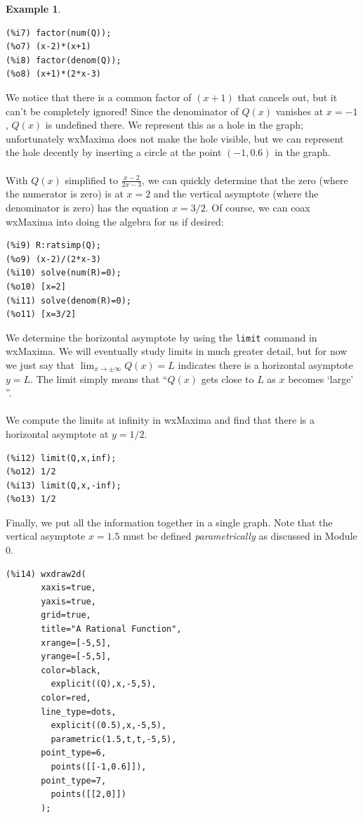 \documentclass[10.5pt,twoside]{report}
\theoremstyle{definition}
\newtheorem{exmp}{Example}[section]
\begin{document}
\begin{exmp}
\begin{verbatim}
(%i7) factor(num(Q));
(%o7) (x-2)*(x+1)
(%i8) factor(denom(Q));
(%o8) (x+1)*(2*x-3)
\end{verbatim}

We notice that there is a common factor of $(x+1)$ that cancels out, but it can't be completely ignored!  Since the denominator of $Q(x)$ vanishes at $x=-1$, $Q(x)$ is undefined there.  We represent this as a hole in the graph; unfortunately wxMaxima does not make the hole visible, but we can represent the hole decently by inserting a circle at the point $(-1,0.6)$ in the graph.\\
${}$\\
With $Q(x)$ simplified to $\frac{x-2}{2x-3}$, we can quickly determine that the zero (where the numerator is zero) is at $x=2$ and the vertical asymptote (where the denominator is zero) has the equation $x=3/2$.  Of course, we can coax wxMaxima into doing the algebra for us if desired:

\begin{verbatim}
(%i9) R:ratsimp(Q);
(%o9) (x-2)/(2*x-3)
(%i10) solve(num(R)=0);
(%o10) [x=2]
(%i11) solve(denom(R)=0);
(%o11) [x=3/2]
\end{verbatim}

We determine the horizontal asymptote by using the \verb|limit| command in wxMaxima.  We will eventually study limits in much greater detail, but for now we just say that $\lim_{x \to \pm\infty} Q(x)=L$ indicates there is a horizontal asymptote $y=L$.  The limit simply means that ``$Q(x)$ gets close to $L$ as $x$ becomes `large' ''.\\
${}$\\
We compute the limits at infinity in wxMaxima and find that there is a horizontal asymptote at $y=1/2$.

\begin{verbatim}
(%i12) limit(Q,x,inf);
(%o12) 1/2
(%i13) limit(Q,x,-inf);
(%o13) 1/2
\end{verbatim}



Finally, we put all the information together in a single graph.  Note that the vertical asymptote $x=1.5$ must be defined \textit{parametrically} as discussed in Module 0.

\begin{verbatim}
(%i14) wxdraw2d(
       xaxis=true,
       yaxis=true,
       grid=true,
       title="A Rational Function",
       xrange=[-5,5],
       yrange=[-5,5],
       color=black,
         explicit((Q),x,-5,5),
       color=red,
       line_type=dots,
         explicit((0.5),x,-5,5),
         parametric(1.5,t,t,-5,5),
       point_type=6,
         points([[-1,0.6]]),
       point_type=7,
         points([[2,0]])
       ); 
\end{verbatim}


\end{exmp}
\end{document}
